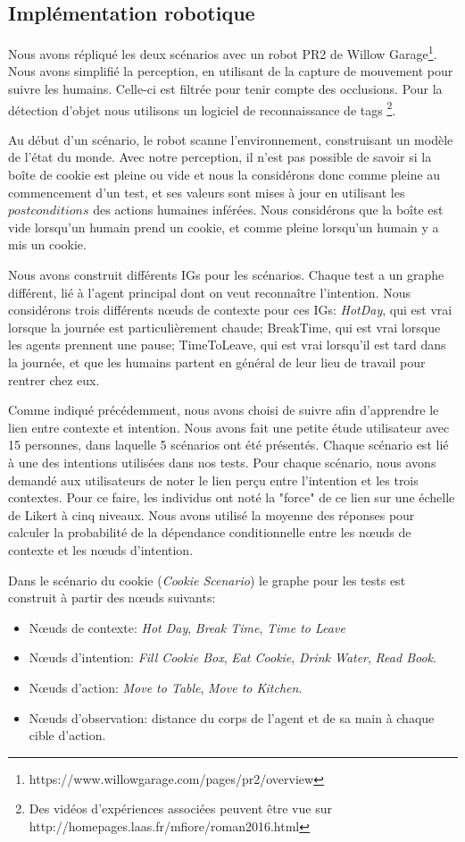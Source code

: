 \documentclass[a4paper,11pt,twoside]{StyleThese}
\begin{document}
\subsection{Implémentation robotique}
\label{sec:expeRobotIntent}
Nous avons répliqué les deux scénarios avec un robot PR2 de Willow Garage\footnote{https://www.willowgarage.com/pages/pr2/overview}. Nous avons simplifié la perception, en utilisant de la capture de mouvement pour suivre les humains. Celle-ci est filtrée pour tenir compte des occlusions. Pour la détection d'objet nous utilisons un logiciel de reconnaissance de tags \footnote{Des vidéos d'expériences associées peuvent être vue sur  http://homepages.laas.fr/mfiore/roman2016.html}. 

Au début d'un scénario, le robot scanne l'environnement, construisant un modèle de l'état du monde. Avec notre perception, il n'est pas possible de savoir si la boîte de cookie est pleine ou vide et nous la considérons donc comme pleine au commencement d'un test, et ses valeurs sont mises à jour en utilisant les $postconditions$ des actions humaines inférées. Nous considérons que la boîte est vide lorsqu'un humain prend un cookie, et comme pleine lorsqu'un humain y a mis un cookie.

Nous avons construit différents IGs pour les scénarios. Chaque test a un graphe différent, lié à l'agent principal dont on veut reconnaître l'intention. Nous considérons trois différents nœuds de contexte pour ces IGs: \textit{HotDay}, qui est vrai lorsque la journée est particulièrement chaude; BreakTime, qui est vrai lorsque les agents prennent une pause; TimeToLeave, qui est vrai lorsqu'il est tard dans la journée, et que les humains partent en général de leur lieu de travail pour rentrer chez eux.

Comme indiqué précédemment, nous avons choisi de suivre \cite{Liu2014} afin d'apprendre le lien entre contexte et intention. Nous avons fait une petite étude utilisateur avec 15 personnes, dans laquelle 5 scénarios ont été présentés. Chaque scénario est lié à une des intentions utilisées dans nos tests. Pour chaque scénario, nous avons demandé aux utilisateurs de noter le lien perçu entre l'intention et les trois contextes. Pour ce faire, les individus ont noté la "force" de ce lien sur une échelle de Likert à cinq niveaux. Nous avons utilisé la moyenne des réponses pour calculer la probabilité de la dépendance conditionnelle entre les nœuds de contexte et les nœuds d'intention.


Dans le scénario  du cookie (\textit{Cookie Scenario}) le graphe pour les tests est construit à partir des nœuds suivants:
\begin{itemize}
\item Nœuds de contexte: \textit{Hot Day}, \textit{Break Time}, \textit{Time to Leave}
\item Nœuds d'intention: \textit{Fill Cookie Box}, \textit{Eat Cookie}, \textit{Drink Water}, \textit{Read Book}.
\item Nœuds d'action: \textit{Move to Table}, \textit{Move to Kitchen}.
\item Nœuds d'observation: distance du corps de l'agent et de sa main à chaque cible d'action.
\end{itemize}
\end{document}
